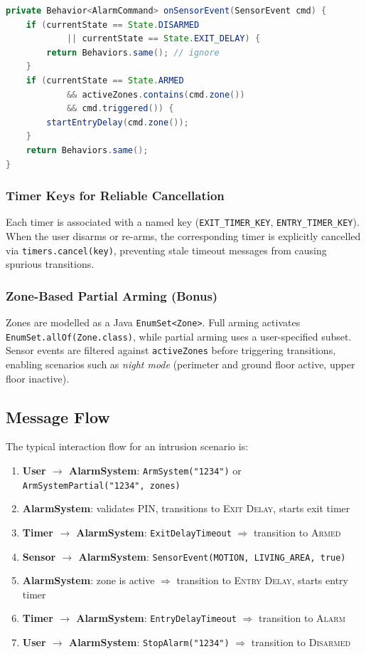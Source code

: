 \documentclass[a4paper, 12pt]{article}
\begin{document}
\begin{lstlisting}[language=Java, caption={Guard-based state handling (excerpt).}]
private Behavior<AlarmCommand> onSensorEvent(SensorEvent cmd) {
    if (currentState == State.DISARMED
            || currentState == State.EXIT_DELAY) {
        return Behaviors.same(); // ignore
    }
    if (currentState == State.ARMED
            && activeZones.contains(cmd.zone())
            && cmd.triggered()) {
        startEntryDelay(cmd.zone());
    }
    return Behaviors.same();
}
\end{lstlisting}

\subsubsection{Timer Keys for Reliable Cancellation}

Each timer is associated with a named key (\texttt{EXIT\_TIMER\_KEY}, \texttt{ENTRY\_TIMER\_KEY}). When the user disarms or re-arms, the corresponding timer is explicitly cancelled via \texttt{timers.cancel(key)}, preventing stale timeout messages from causing spurious transitions.

\subsubsection{Zone-Based Partial Arming (Bonus)}

Zones are modelled as a Java \texttt{EnumSet<Zone>}. Full arming activates \texttt{EnumSet.allOf(Zone.class)}, while partial arming uses a user-specified subset. Sensor events are filtered against \texttt{activeZones} before triggering transitions, enabling scenarios such as \emph{night mode} (perimeter and ground floor active, upper floor inactive).

\subsection{Message Flow}

The typical interaction flow for an intrusion scenario is:

\begin{enumerate}
  \item \textbf{User $\rightarrow$ AlarmSystem}: \texttt{ArmSystem("1234")} or \texttt{ArmSystemPartial("1234", zones)}
  \item \textbf{AlarmSystem}: validates PIN, transitions to \textsc{Exit Delay}, starts exit timer
  \item \textbf{Timer $\rightarrow$ AlarmSystem}: \texttt{ExitDelayTimeout} $\Rightarrow$ transition to \textsc{Armed}
  \item \textbf{Sensor $\rightarrow$ AlarmSystem}: \texttt{SensorEvent(MOTION, LIVING\_AREA, true)}
  \item \textbf{AlarmSystem}: zone is active $\Rightarrow$ transition to \textsc{Entry Delay}, starts entry timer
  \item \textbf{Timer $\rightarrow$ AlarmSystem}: \texttt{EntryDelayTimeout} $\Rightarrow$ transition to \textsc{Alarm}
  \item \textbf{User $\rightarrow$ AlarmSystem}: \texttt{StopAlarm("1234")} $\Rightarrow$ transition to \textsc{Disarmed}
\end{enumerate}
\end{document}
